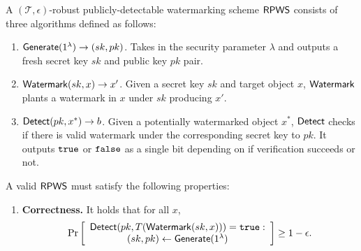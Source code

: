 \documentclass[12pt]{article}
\begin{document}
\begin{definition}

A $(\mathcal{T}, \epsilon)$-robust publicly-detectable watermarking scheme $\mathsf{RPWS}$ consists of three algorithms defined as follows:

\begin{enumerate}
    \item $\mathsf{Generate}(1^\lambda) \to (sk, pk)$. Takes in the security parameter $\lambda$ and outputs a fresh secret key $sk$ and public key $pk$ pair.
    
    \item $\mathsf{Watermark}(sk, x) \to x'$. Given a secret key $sk$ and target object $x$, $\mathsf{Watermark}$ plants a watermark in $x$ under $sk$ producing $x'$.
    
    \item $\mathsf{Detect}(pk, x^*) \to b$. Given a potentially watermarked object $x^*$, $\mathsf{Detect}$ checks if there is valid watermark under the corresponding secret key to $pk$. It outputs $\mathtt{true}$ or $\mathtt{false}$ as a single bit depending on if verification succeeds or not.
\end{enumerate}

A valid $\mathsf{RPWS}$ must satisfy the following properties:

\begin{enumerate}
    \item \textbf{Correctness.}
    It holds that for all $x$,
    \begin{align*}
        \Pr\left[
        \begin{array}{ccc}
            \begin{matrix}
                \mathsf{Detect}(pk, T(\mathsf{Watermark}(sk, x))) = \mathtt{true}: \\
                (sk, pk) \gets \mathsf{Generate}(1^\lambda) \\
            \end{matrix} \\
        \end{array}
        \right] \geq 1 - \epsilon.
    \end{align*}
    

\end{enumerate}
\end{definition}
\end{document}
